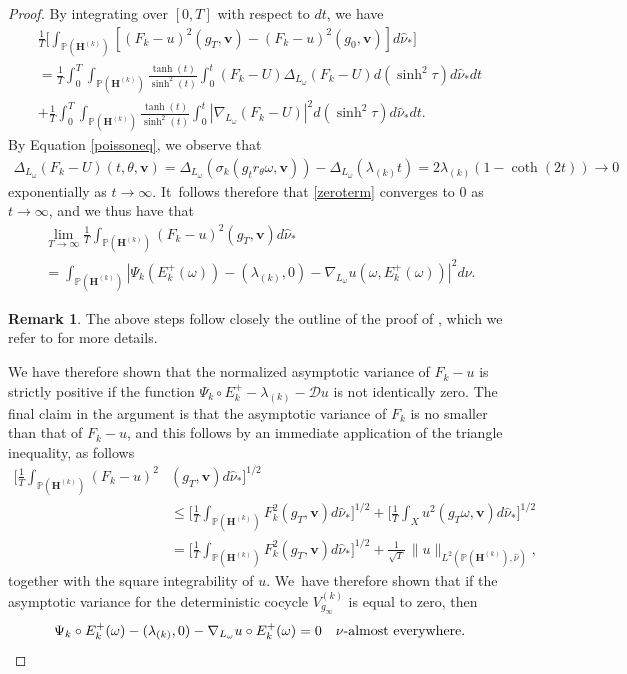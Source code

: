 \documentclass[10pt]{amsart}
\theoremstyle{plain}
\theoremstyle{definition}
\newtheorem{rem}[thm]{Remark}
\numberwithin{equation}{subsection}
\newcommand\bP{\mathbb{P}}
\newcommand\cD{\mathcal{D}}
\let\gradient\nabla
\let\laplacian\Delta
\newcommand{\bfH}{\boldsymbol{H}}
\newcommand{\bfv}{\boldsymbol{v}}
\begin{document}
\begin{proof}
\pagebreak[2]
By integrating over $[0,T]$ with respect to $dt$, we have
\begin{multline}\label{zeroterm}
\frac{1}{T}\biggl[\int_{\bP(\bfH^{(k)})}[(F_k-u)^2(g_T, \bfv)-(F_k-u)^2(g_0, \bfv)]d\hat{\nu}_*\biggr] \\
= \frac{1}{T} \int_0^T \int_{\bP(\bfH^{(k)})} \frac{\tanh(t)}{\sinh^2(t)} \int_{0}^{t} (F_k-U)\laplacian_{L_\omega}(F_k-U) d(\sinh^2\tau)d\hat{\nu}_* dt \\
+ \frac{1}{T} \int_0^T \int_{\bP(\bfH^{(k)})} \frac{\tanh(t)}{\sinh^2(t)} \int_{0}^{t} |\gradient_{L_\omega}(F_k-U)|^2 d(\sinh^2\tau)d\hat{\nu}_* dt.
\end{multline}
By Equation \eqref{poissoneq}, we observe that
\begin{align*}
\laplacian_{L_\omega}(F_k-U)(t,\theta, \bfv)  = \laplacian_{L_\omega}(\sigma_k(g_t r_\theta\omega, \bfv)) -\laplacian_{L_\omega}(\lambda_{(k)} t)
 = 2\lambda_{(k)} (1- \coth(2t)) \to 0 
\end{align*}
exponentially as $t\to\infty$. It~follows therefore that \eqref{zeroterm} converges to 0 as $t\to \infty$, and we thus have that
\begin{multline*}
\lim_{T\to\infty}\frac{1}{T}\int_{\bP(\bfH^{(k)})}(F_k-u)^2(g_T, \bfv)d\hat{\nu}_*\\
=\int_{\bP(\bfH^{(k)})} |\Psi_k(E^+_k(\omega))- (\lambda_{(k)},0) -\gradient_{L_\omega} u(\omega,E^+_k(\omega))|^2 d\nu.
\end{multline*}
\begin{rem}
The above steps follow closely the outline of the proof of \cite[Th.\,1]{FMZ12}, which we refer to for more details.
\end{rem}

We have therefore shown that the normalized asymptotic variance of $F_k-u$ is strictly positive if the function $ \Psi_k \circ E^+_k - \lambda_{(k)} -\cD u$ is not identically zero. The final claim in the argument is that the asymptotic variance of $F_k$ is no smaller than that of $F_k-u$, and this follows by an immediate application of the triangle inequality, as follows
\begin{align*}
\biggl[\frac{1}{T}\int_{\bP(\bfH^{(k)})} (F_k-u)^2&(g_T, \bfv)d\hat\nu_* \biggr]^{1/2}\\
&\leq \biggl[\frac{1}{T}\int_{\bP(\bfH^{(k)})} F_k^2(g_T, \bfv)d\hat \nu_* \biggr]^{1/2}+ \biggl[\frac{1}{T}\int_{X} u^2(g_T\omega, \bfv)d\hat\nu_* \biggr]^{1/2} \\
&= \biggl[\frac{1}{T}\int_{\bP(\bfH^{(k)})} F_k^2(g_T, \bfv)d\hat \nu_* \biggr]^{1/2}+ \frac{1}{\sqrt{T}}\,\|u\|_{L^2(\bP(\bfH^{(k)}),\hat \nu)},
\end{align*}
together with the square integrability of $u$. We~have therefore shown that if the asymptotic variance for the deterministic cocycle $V^{(k)}_{g_\infty}$ is equal to
zero, then
\begin{equation}
\Psi_k \circ E^+_k(\omega) - (\lambda_{(k)},0) -\gradient_{L_\omega}u\circ E^+_k(\omega) =0 \quad \nu\text{-almost everywhere.} \label{zerovariancecond}\qedhere
\end{equation}
\end{proof}
\end{document}
